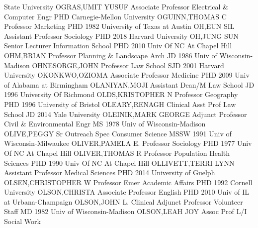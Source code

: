 \documentclass[
]{article}
\begin{document}
State University \textbar OGRAS,UMIT YUSUF \textbar{} 
\textbar Associate Professor \textbar Electrical \& Computer Engr
\textbar PHD Carnegie-Mellon University \textbar OGUINN,THOMAS C
\textbar{}  \textbar Professor \textbar Marketing
\textbar PHD 1982 University of Texas at Austin \textbar OH,EUN SIL
\textbar{}  \textbar Assistant Professor \textbar Sociology
\textbar PHD 2018 Harvard University \textbar OH,JUNG SUN \textbar{}
 \textbar Senior Lecturer \textbar Information School
\textbar PHD 2010 Univ Of NC At Chapel Hill \textbar OHM,BRIAN
\textbar{}  \textbar Professor \textbar Planning \&
Landscape Arch \textbar JD 1986 Univ of Wisconsin-Madison
\textbar OHNESORGE,JOHN \textbar{}  \textbar Professor
\textbar Law School \textbar SJD 2001 Harvard University
\textbar OKONKWO,OZIOMA \textbar{}  \textbar Associate
Professor \textbar Medicine \textbar PHD 2009 Univ of Alabama at
Birmingham \textbar OLANIYAN,MOJI \textbar{} 
\textbar Assistant Dean/M \textbar Law School \textbar JD 1996
University Of Richmond \textbar OLDS,KRISTOPHER N \textbar{}
 \textbar Professor \textbar Geography \textbar PHD 1996
University of Bristol \textbar OLEARY,RENAGH \textbar{} 
\textbar Clinical Asst Prof \textbar Law School \textbar JD 2014 Yale
University \textbar OLEINIK,MARK GEORGE \textbar{} 
\textbar Adjunct Professor \textbar Civil \& Environmental Engr
\textbar MS 1978 Univ of Wisconsin-Madison \textbar OLIVE,PEGGY
\textbar{}  \textbar Sr Outreach Spec \textbar Consumer
Science \textbar MSSW 1991 Univ of Wisconsin-Milwaukee
\textbar OLIVER,PAMELA E. \textbar{}  \textbar Professor
\textbar Sociology \textbar PHD 1977 Univ Of NC At Chapel Hill
\textbar OLIVER,THOMAS R \textbar{}  \textbar Professor
\textbar Population Health Sciences \textbar PHD 1990 Univ Of NC At
Chapel Hill \textbar OLLIVETT,TERRI LYNN \textbar{} 
\textbar Assistant Professor \textbar Medical Sciences \textbar PHD 2014
University of Guelph \textbar OLSEN,CHRISTOPHER W \textbar{}
 \textbar Professor Emer \textbar Academic Affairs
\textbar PHD 1992 Cornell University \textbar OLSON,CHRISTA \textbar{}
 \textbar Associate Professor \textbar English \textbar PHD
2010 Univ of IL at Urbana-Champaign \textbar OLSON,JOHN L. \textbar{}
 \textbar Clinical Adjunct Professor \textbar Volunteer
Staff \textbar MD 1982 Univ of Wisconsin-Madison \textbar OLSON,LEAH JOY
\textbar{}  \textbar Assoc Prof L/I \textbar Social Work
\end{document}
